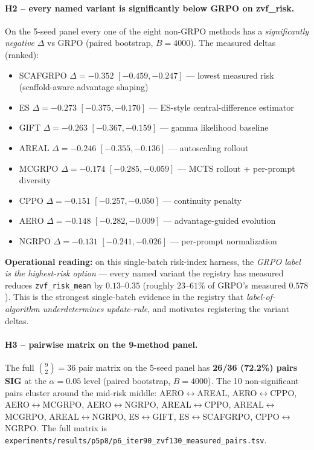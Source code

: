 \documentclass{article}
\begin{document}
\paragraph{H2 -- every named variant is significantly below GRPO on zvf\_risk.}
On the 5-seed panel every one of the eight non-GRPO methods has a
\emph{significantly negative} $\Delta$ vs GRPO (paired bootstrap, $B{=}4000$).
The measured deltas (ranked):
\begin{itemize}\itemsep0pt
\item SCAFGRPO $\Delta{=}{-}0.352$ $[-0.459, {-}0.247]$ --- lowest measured risk (scaffold-aware advantage shaping)
\item ES       $\Delta{=}{-}0.273$ $[-0.375, {-}0.170]$ --- ES-style central-difference estimator
\item GIFT     $\Delta{=}{-}0.263$ $[-0.367, {-}0.159]$ --- gamma likelihood baseline
\item AREAL    $\Delta{=}{-}0.246$ $[-0.355, {-}0.136]$ --- autoscaling rollout
\item MCGRPO   $\Delta{=}{-}0.174$ $[-0.285, {-}0.059]$ --- MCTS rollout + per-prompt diversity
\item CPPO     $\Delta{=}{-}0.151$ $[-0.257, {-}0.050]$ --- continuity penalty
\item AERO     $\Delta{=}{-}0.148$ $[-0.282, {-}0.009]$ --- advantage-guided evolution
\item NGRPO    $\Delta{=}{-}0.131$ $[-0.241, {-}0.026]$ --- per-prompt normalization
\end{itemize}
\textbf{Operational reading:} on this single-batch risk-index harness, the
\emph{GRPO label is the highest-risk option} --- every named variant the
registry has measured reduces \texttt{zvf\_risk\_mean} by $0.13$--$0.35$
(roughly $23$--$61\%$ of GRPO's measured $0.578$). This is the strongest
single-batch evidence in the registry that \emph{label-of-algorithm
underdetermines update-rule}, and motivates registering the variant deltas.

\paragraph{H3 -- pairwise matrix on the 9-method panel.}
The full $\binom{9}{2}{=}36$ pair matrix on the 5-seed panel has
\textbf{26/36 (72.2\%) pairs SIG} at the $\alpha{=}0.05$ level (paired
bootstrap, $B{=}4000$). The 10 non-significant pairs cluster around the
mid-risk middle: AERO$\leftrightarrow$AREAL,
AERO$\leftrightarrow$CPPO, AERO$\leftrightarrow$MCGRPO,
AERO$\leftrightarrow$NGRPO, AREAL$\leftrightarrow$CPPO,
AREAL$\leftrightarrow$MCGRPO, AREAL$\leftrightarrow$NGRPO,
ES$\leftrightarrow$GIFT, ES$\leftrightarrow$SCAFGRPO,
CPPO$\leftrightarrow$NGRPO. The full matrix is
\texttt{experiments/results/p5p8/p6\_iter90\_zvf130\_measured\_pairs.tsv}.
\end{document}
